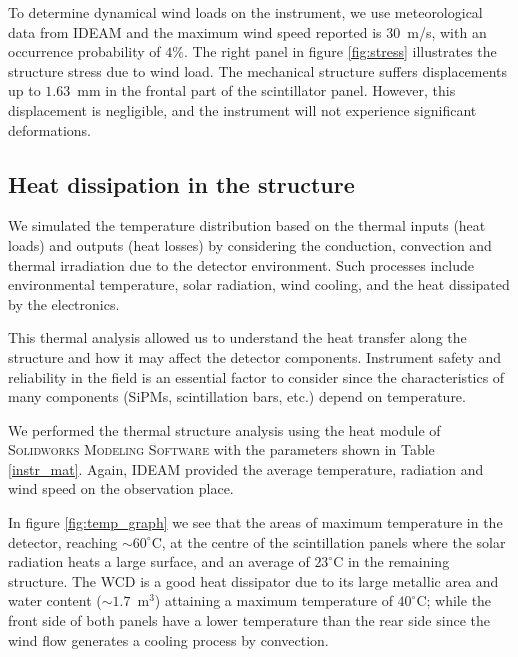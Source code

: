 \documentclass[letterpaper,11pt]{article}
\begin{document}
To determine dynamical wind loads on the instrument, we use meteorological data from IDEAM and the maximum wind speed reported is $30$~m/s, with an occurrence probability of $4\%$. The right panel in figure \ref{fig:stress} illustrates the structure stress due to wind load. The mechanical structure suffers displacements up to $1.63$~mm in the frontal part of the scintillator panel. However, this displacement is negligible, and the instrument will not experience significant deformations.

\subsection{Heat dissipation in the structure}
We simulated the temperature distribution based on the thermal inputs (heat loads) and outputs (heat losses) by considering the conduction, convection and thermal irradiation due to the detector environment. Such processes include environmental temperature, solar radiation, wind cooling, and the heat dissipated by the electronics.

This thermal analysis allowed us to understand the heat transfer along the structure and how it may affect the detector components. Instrument safety and reliability in the field is an essential factor to consider since the characteristics of many components (SiPMs, scintillation bars, etc.) depend on temperature. 

We performed the thermal structure analysis using the heat module of \textsc{Solidworks Modeling Software} with the parameters shown in Table \ref{instr_mat}. Again, IDEAM provided the average temperature, radiation and wind speed on the observation place.

In figure \ref{fig:temp_graph} we see that the areas of maximum temperature in the detector, reaching $\sim 60^{\circ}$C, at the centre of the scintillation panels where the solar radiation heats a large surface, and an average of $23^{\circ}$C in the remaining structure. The WCD is a good heat dissipator due to its large metallic area and water content ($\sim 1.7$~m$^3$) attaining a maximum temperature of $40^{\circ}$C; while the front side of both panels have a lower temperature than the rear side since the wind flow generates a cooling process by convection. 
\end{document}
